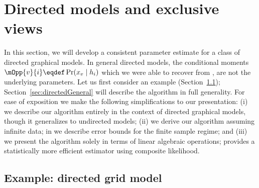 \section{Directed models and exclusive views}
\label{sec:directed}


  In this section, we will develop a consistent parameter estimate for a class of directed graphical models.
  In general directed models, the conditional moments $\mOpp{v}{i} \eqdef \Pr(x_v \mid h_i)$
which we were able to recover from {\TensorFactorize}, are not the underlying parameters.
  Let us first consider an example (Section~\ref{sec:directedExample});
  Section~\ref{sec:directedGeneral} will describe the algorithm in full generality.
For ease of exposition we make the following simplifications to our presentation:
(i) we describe our algorithm entirely in the context of directed
  graphical models, though it generalizes to undirected models;
(ii) we derive our algorithm assuming infinite data; in  we 
  describe error bounds for the finite sample regime; and
(iii) we present the algorithm solely in terms of linear algebraic operations;
   provides a statistically
  more efficient estimator using composite likelihood.

\subsection{Example: directed grid model}
\label{sec:directedExample}

%  

